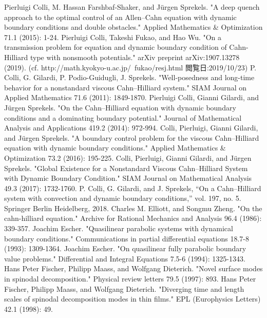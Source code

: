 \documentclass[a4paper]{article}
\begin{document}
\begin{thebibliography}{99}
		Pierluigi Colli, M. Hassan Farshbaf-Shaker, and Jürgen Sprekels. "A deep quench approach to the optimal control of an Allen–Cahn equation with dynamic boundary conditions and double obstacles." Applied Mathematics \& Optimization 71.1 (2015): 1-24.
		Pierluigi Colli, Takeshi Fukao, and Hao Wu. "On a transmission problem for equation and dynamic boundary condition of Cahn-Hilliard type with nonsmooth potentials." arXiv preprint arXiv:1907.13278 (2019).
		(cf. http://math.kyokyo-u.ac.jp/~fukao/resj.html 閲覧日:2019/10/23)
		P. Colli, G. Gilardi, P. Podio-Guidugli, J. Sprekels. "Well-posedness and long-time behavior for a nonstandard viscous Cahn–Hilliard system." SIAM Journal on Applied Mathematics 71.6 (2011): 1849-1870.
		Pierluigi Colli, Gianni Gilardi, and J\"urgen Sprekels. "On the Cahn–Hilliard equation with dynamic boundary conditions and a dominating boundary potential." Journal of Mathematical Analysis and Applications 419.2 (2014): 972-994.
		Colli, Pierluigi, Gianni Gilardi, and J\"urgen Sprekels. "A boundary control problem for the viscous Cahn–Hilliard equation with dynamic boundary conditions." Applied Mathematics \& Optimization 73.2 (2016): 195-225.
		Colli, Pierluigi, Gianni Gilardi, and J\"urgen Sprekels. "Global Existence for a Nonstandard Viscous Cahn--Hilliard System with Dynamic Boundary Condition." SIAM Journal on Mathematical Analysis 49.3 (2017): 1732-1760.
		P. Colli, G. Gilardi, and J. Sprekels, “On a Cahn--Hilliard system with convection and dynamic boundary conditions,” vol. 197, no. 5. Springer Berlin Heidelberg, 2018.
		Charles M. Elliott, and Songmu Zheng. "On the cahn-hilliard equation." Archive for Rational Mechanics and Analysis 96.4 (1986): 339-357.
		Joachim Escher. "Quasilinear parabolic systems with dynamical boundary conditions." Communications in partial differential equations 18.7-8 (1993): 1309-1364.
		Joachim Escher. "On quasilinear fully parabolic boundary value problems." Differential and Integral Equations 7.5-6 (1994): 1325-1343.
		Hans Peter Fischer, Philipp Maass, and Wolfgang Dieterich. "Novel surface modes in spinodal decomposition." Physical review letters 79.5 (1997): 893.
		Hans Peter Fischer, Philipp Maass, and Wolfgang Dieterich. "Diverging time and length scales of spinodal decomposition modes in thin films." EPL (Europhysics Letters) 42.1 (1998): 49.

\end{thebibliography}
\end{document}
